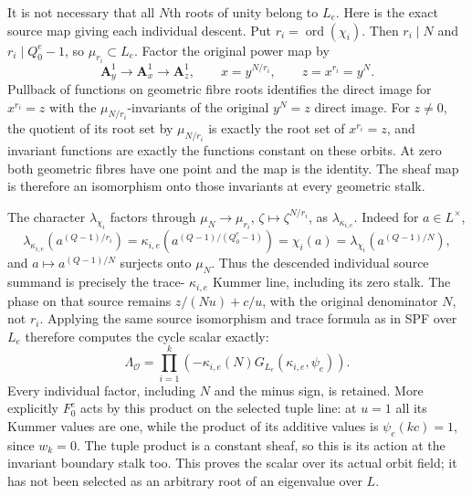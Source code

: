 It is not necessary that all \(N\)th roots of unity
belong to \(L_e\). Here is the exact source map
giving each individual descent. Put
\(r_i=\operatorname{ord}(\chi_i)\). Then
\(r_i\mid N\) and \(r_i\mid Q_0^e-1\), so
\(\mu_{r_i}\subset L_e\). Factor the original
power map by
\[
 \mathbf A^1_y\longrightarrow\mathbf A^1_x
       \longrightarrow\mathbf A^1_z,\qquad
 x=y^{N/r_i},\qquad z=x^{r_i}=y^N .
\]
Pullback of functions on geometric fibre roots
identifies the direct image for \(x^{r_i}=z\)
with the \(\mu_{N/r_i}\)-invariants of the
original \(y^N=z\) direct image. For \(z\ne0\),
the quotient of its root set by
\(\mu_{N/r_i}\) is exactly the root set of
\(x^{r_i}=z\), and invariant functions are
exactly the functions constant on these
orbits. At zero both geometric fibres have
one point and the map is the identity.
The sheaf map is therefore an isomorphism
onto those invariants at every geometric stalk.

The character \(\lambda_{\chi_i}\) factors
through \(\mu_N\to\mu_{r_i}\),
\(\zeta\mapsto\zeta^{N/r_i}\), as
\(\lambda_{\kappa_{i,e}}\). Indeed for
\(a\in L^\times\),
\[
 \lambda_{\kappa_{i,e}}(a^{(Q-1)/r_i})
   =\kappa_{i,e}(a^{(Q-1)/(Q_0^e-1)})
   =\chi_i(a)
   =\lambda_{\chi_i}(a^{(Q-1)/N}),
\]
and \(a\mapsto a^{(Q-1)/N}\) surjects onto
\(\mu_N\). Thus the descended individual
source summand is precisely the trace-
\(\kappa_{i,e}\) Kummer line, including
its zero stalk. The phase on that source
remains \(z/(Nu)+c/u\), with the original
denominator \(N\), not \(r_i\).
Applying the same source isomorphism and
trace formula as in SPF over \(L_e\)
therefore computes the cycle scalar exactly:
\[
 \Lambda_{\mathcal O}
   =\prod_{i=1}^k\left(
        -\kappa_{i,e}(N)G_{L_e}(\kappa_{i,e},\psi_e)\right).
 \tag{TPF.30}\label{CFStage:eq:TPF30}
\]
Every individual factor, including \(N\) and the minus
sign, is retained. More explicitly \(F_0^e\) acts
by this product on the selected tuple line: at
\(u=1\) all its Kummer values are one, while
the product of its additive values is
\(\psi_e(kc)=1\), since \(w_k=0\).
The tuple product is a constant sheaf, so this
is its action at the invariant boundary stalk too.
This proves the scalar over its actual orbit
field; it has not been selected as an arbitrary
root of an eigenvalue over \(L\).

